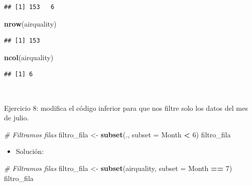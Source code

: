\documentclass[11pt,]{book}
\newenvironment{Shaded}{\begin{snugshade}}{\end{snugshade}}
\newcommand{\CommentTok}[1]{\textcolor[rgb]{0.37,0.37,0.37}{\textit{#1}}}
\newcommand{\DataTypeTok}[1]{\textcolor[rgb]{0.27,0.27,0.27}{#1}}
\newcommand{\DecValTok}[1]{\textcolor[rgb]{0.06,0.06,0.06}{#1}}
\newcommand{\KeywordTok}[1]{\textcolor[rgb]{0.27,0.27,0.27}{\textbf{#1}}}
\newcommand{\NormalTok}[1]{#1}
\newcommand{\OperatorTok}[1]{\textcolor[rgb]{0.43,0.43,0.43}{\textbf{#1}}}
\newcommand{\StringTok}[1]{\textcolor[rgb]{0.5,0.5,0.5}{#1}}
\providecommand{\tightlist}{%
  \setlength{\itemsep}{0pt}\setlength{\parskip}{0pt}}
\begin{document}
\begin{verbatim}
## [1] 153   6
\end{verbatim}

\begin{Shaded}
\begin{Highlighting}[]
\KeywordTok{nrow}\NormalTok{(airquality)}
\end{Highlighting}
\end{Shaded}

\begin{verbatim}
## [1] 153
\end{verbatim}

\begin{Shaded}
\begin{Highlighting}[]
\KeywordTok{ncol}\NormalTok{(airquality)}
\end{Highlighting}
\end{Shaded}

\begin{verbatim}
## [1] 6
\end{verbatim}

~

Ejercicio 8: modifica el código inferior para que nos filtre solo los datos del mes de julio.

\begin{Shaded}
\begin{Highlighting}[]
\CommentTok{# Filtramos filas}
\NormalTok{filtro_fila <-}\StringTok{ }\KeywordTok{subset}\NormalTok{(., }\DataTypeTok{subset =}\NormalTok{ Month }\OperatorTok{<}\StringTok{ }\DecValTok{6}\NormalTok{)}
\NormalTok{filtro_fila}
\end{Highlighting}
\end{Shaded}

\begin{itemize}
\tightlist
\item
  Solución:
\end{itemize}

\begin{Shaded}
\begin{Highlighting}[]
\CommentTok{# Filtramos filas}
\NormalTok{filtro_fila <-}\StringTok{ }\KeywordTok{subset}\NormalTok{(airquality, }\DataTypeTok{subset =}\NormalTok{ Month }\OperatorTok{==}\StringTok{ }\DecValTok{7}\NormalTok{)}
\NormalTok{filtro_fila}
\end{Highlighting}
\end{Shaded}
\end{document}
